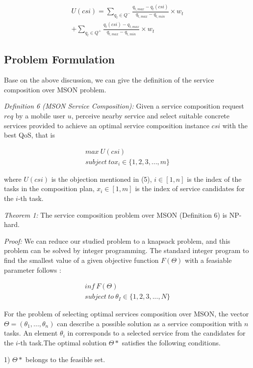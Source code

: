 \documentclass[10pt,journal,compsoc]{IEEEtran}
\begin{document}
\begin{eqnarray}
U(csi) = \sum_{q_t \in Q^-} \frac{q_{t,max}-q_t(csi)}{q_{t,max}-q_{t,min}}\times w_t \\\nonumber
+\sum_{q_t \in Q^+} \frac{q_t(csi)-q_{t,max}}{q_{t,max}-q_{t,min}}\times w_t
\end{eqnarray}

\subsection{Problem Formulation}
Base on the above discussion, we can give the definition of the service composition over MSON problem.

\textit{Definition 6 (MSON Service Composition):} Given a service composition request $req$ by a mobile user $u$, perceive nearby service and select suitable concrete services provided to achieve an optimal service composition instance $csi$ with the best QoS, that is

\begin{eqnarray}
max \ U(csi) \\
subject\ to x_i \in \{1,2,3,...,m \}
\end{eqnarray}

where $U(csi)$ is the objection mentioned in (5), $i \in [1,n]$ is the index of the tasks in the composition plan, $x_i \in [1, m]$ is the index of service candidates for the $i$-th task.

\textit{Theorem 1:} The service composition problem over MSON (Definition 6) is NP-hard.

\textit{Proof:} We can reduce our studied problem to a knapsack problem, and this problem can be solved by integer programming. The standard integer program to find the smallest value of a given objective function $F( \Theta)$ with a feasiable parameter follows \cite{glover1986future}:

\begin{eqnarray}
inf \ F(\Theta)\\\nonumber
subject \ to \ \theta_I \in\{1,2,3,...,N\}
\end{eqnarray}

For the problem of selecting optimal services composition over MSON, the vector $\Theta= (θ_1, . . . , θ_n)$ can describe a possible solution as a service composition with $n$ tasks. An element $θ_i$ in corresponds to a selected service from the candidates for the $i$-th task.The optimal solution  $\Theta*$ satisfies the following conditions.

1) $\Theta *$ belongs to the feasible set.
\end{document}
